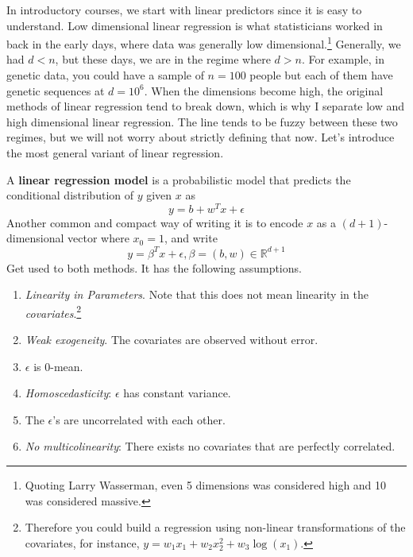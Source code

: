 In introductory courses, we start with linear predictors since it is easy to understand. Low dimensional linear regression is what statisticians worked in back in the early days, where data was generally low dimensional.\footnote{Quoting Larry Wasserman, even 5 dimensions was considered high and 10 was considered massive. } Generally, we had $d < n$, but these days, we are in the regime where $d > n$. For example, in genetic data, you could have a sample of $n = 100$ people but each of them have genetic sequences at $d = 10^6$. When the dimensions become high, the original methods of linear regression tend to break down, which is why I separate low and high dimensional linear regression. The line tends to be fuzzy between these two regimes, but we will not worry about strictly defining that now. Let's introduce the most general variant of linear regression. 

\begin{definition}
  \label{def:linear-regression-model}
  A \textbf{linear regression model} is a probabilistic model that predicts the conditional distribution of $y$ given $x$ as 
  \begin{equation}
    y = b + w^T x + \epsilon
  \end{equation}
  Another common and compact way of writing it is to encode $x$ as a $(d+1)$-dimensional vector where $x_0 = 1$, and write 
  \begin{equation}
    y = \beta^T x + \epsilon, \beta = (b, w) \in \mathbb{R}^{d+1}
  \end{equation}
  Get used to both methods. It has the following assumptions. 
  \begin{enumerate}
    \item \textit{Linearity in Parameters}. Note that this does not mean linearity in the \textit{covariates}.\footnote{Therefore you could build a regression using non-linear transformations of the covariates, for instance, $y = w_1 x_1 + w_2 x_2^2 + w_3 \log(x_1)$. }
    \item \textit{Weak exogeneity}. The covariates are observed without error. 
    \item $\epsilon$ is $0$-mean. 
    \item \textit{Homoscedasticity}: $\epsilon$ has constant variance. 
    \item The $\epsilon$'s are uncorrelated with each other. 
    \item \textit{No multicolinearity}: There exists no covariates that are perfectly correlated. 
  \end{enumerate}
\end{definition} 

